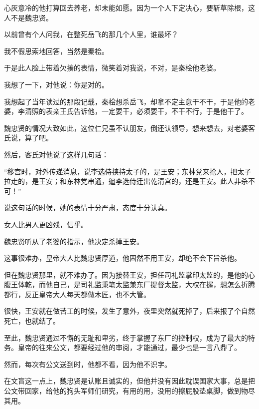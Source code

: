 \begin{multicols}{\theparacolNo}
心灰意冷的他打算回去养老，却未能如愿。因为一个人下定决心，要斩草除根，这人不是魏忠贤。

以前曾有个人问我，在整死岳飞的那几个人里，谁最坏？

我不假思索地回答，当然是秦桧。

于是此人脸上带着欠揍的表情，微笑着对我说，不对，是秦桧他老婆。

我想了一下，对他说：你是对的。

我想起了当年读过的那段记载，秦桧想杀岳飞，却拿不定主意干不干，于是他的老婆，李清照的表亲王氏告诉他，一定要干，必须要干，不干不行，于是他干了。

魏忠贤的情况大致如此，这位仁兄虽不认朋友，倒还认领导，想来想去，对老婆客氏说，算了吧。

然后，客氏对他说了这样几句话：

“移宫时，对外传递消息，说李选侍挟持太子的，是王安；东林党来抢人，把太子拉走的，是王安；和东林党串通，逼李选侍迁出乾清宫的，还是王安。此人非杀不可！”

说这句话的时候，她的表情十分严肃，态度十分认真。

女人比男人更凶残，信乎。

魏忠贤听从了老婆的指示，他决定杀掉王安。

这事很难办，皇帝大人比魏忠贤厚道，他固然不用王安，却绝不会下旨杀他。

但在魏忠贤那里，就不难办了。因为接替王安，担任司礼监掌印太监的，是他的心腹王体乾，而他自己，是司礼监秉笔太监兼东厂提督太监，大权在握，想怎么折腾都行，反正皇帝大人每天都做木匠，也不大管。

很快，王安就在做苦工的时候，发生了意外，夜里突然就死掉了，后来报了个自然死亡，也就结了。

至此，魏忠贤通过不懈的无耻和卑劣，终于掌握了东厂的控制权，成为了最大的特务。皇帝的往来公文，都要经过他的审阅，才能通过，最少也是一言八鼎了。

然而，每次有公文送到时，他都不看，因为他不识字。

在文盲这一点上，魏忠贤是认账且诚实的，但他并没有因此耽误国家大事，总是把公文带回家，给他的狗头军师们研究，有用的用，没用的擦屁股垫桌脚，做到物尽其用。

\ifnum{}
	\end{multicols}
\fi
\newpage
